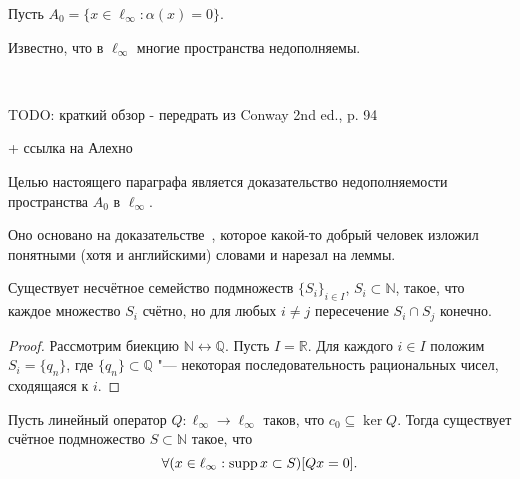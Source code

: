 Пусть $A_0 = \{x\in\ell_\infty : \alpha(x) = 0\}$.

Известно, что в $\ell_\infty$ многие пространства недополняемы.

~\cite{phillips1940linear}

TODO: краткий обзор - передрать из Conway 2nd ed., p. 94

+ ссылка на Алехно~\cite[Theorem 8]{alekhno2006propertiesII}

Целью настоящего параграфа является доказательство недополняемости пространства $A_0$ в $\ell_\infty$.

Оно основано на доказательстве~\cite{whitley1968projecting},
которое какой-то добрый человек изложил
~\cite{mathSE_Phillips} понятными (хотя и английскими) словами и нарезал на леммы.

\begin{lemma}
	\label{lem:uncountable_subsets_of_N_with_finite_intersections}
	Существует несчётное семейство подмножеств $\{S_i\}_{i\in I}$, $S_i \subset \mathbb{N}$,
	такое, что каждое множество $S_i$ счётно, но для любых $i\neq j$ пересечение $S_i \cap S_j$ конечно.
\end{lemma}

\begin{proof}
	Рассмотрим биекцию $\mathbb{N} \leftrightarrow \mathbb{Q}$.
	Пусть $I = \mathbb{R}$.
	Для каждого $i\in I$ положим $S_i = \{q_n\}$,
	где $\{q_n\} \subset \mathbb{Q}$ "--- некоторая последовательность рациональных чисел,
	сходящаяся к $i$.
\end{proof}

\begin{lemma}
	\label{lem:c_0_not_complemented}
	Пусть линейный оператор $Q: \ell_\infty \to \ell_{\infty}$ таков, что $c_0\subseteq \ker Q$.
	Тогда существует счётное подмножество $S \subset \mathbb{N}$ такое, что
	\begin{equation}
		\forall(x \in \ell_\infty : \operatorname{supp} x \subset S)[Qx = 0]
		.
	\end{equation}
\end{lemma}

